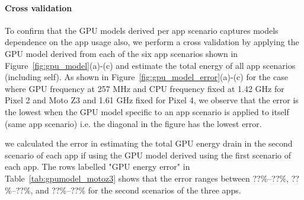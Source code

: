 \paragraph{Cross validation}
To confirm that the GPU models derived per app scenario captures models dependence on the app usage also, we perform  a cross validation by applying
the GPU model derived from each of the six app scenarios shown in Figure~\ref{fig:gpu_model}(a)-(c)
and estimate the total energy of all app scenarios (including self). As shown in 
Figure~\ref{fig:gpu_model_error}(a)-(c) for the case where GPU frequency at 257 MHz  and CPU frequency 
fixed at 1.42 GHz for Pixel 2 and Moto Z3 and 1.61 GHz fixed for Pixel 4,
we observe that the error is the lowest when the GPU model specific to an app scenario is applied
to itself (same app scenario) i.e. the diagonal in the figure has the lowest error.


we calculated the error
in estimating the total GPU energy drain in the second scenario of each app 
if using the GPU model derived using the first scenario of each app.
The rows labelled "GPU energy error" in Table~\ref{tab:gpumodel_motoz3} shows that the error ranges between ??\%--??\%, ??\%--??\%, and ??\%--??\% for the second scenarios of the three apps.
\fi





